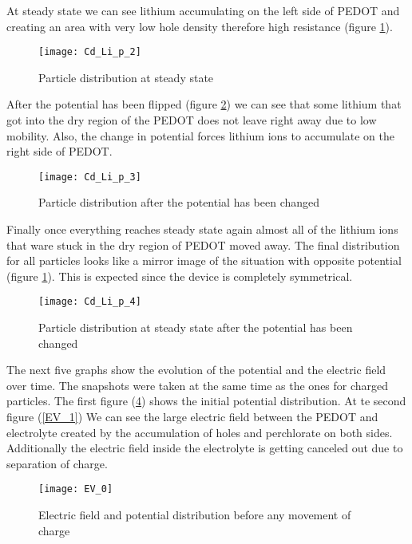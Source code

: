 At steady state we can see lithium accumulating on the left side of PEDOT and creating an area with very low hole density therefore high resistance (figure \ref{Cd_Li_p_2}). 

\begin{figure}[!htp]
\centering
\texttt{[image: Cd\_Li\_p\_2]}
\caption{Particle distribution at steady state} 
\label{Cd_Li_p_2}
\end{figure}

After the potential has been flipped (figure \ref{Cd_Li_p_3}) we can see that some lithium that got into the dry region of the PEDOT does not leave right away due to low mobility. Also, the change in potential forces lithium ions to accumulate on the right side of PEDOT.
 
\begin{figure}[!htp]
\centering
\texttt{[image: Cd\_Li\_p\_3]}
\caption{Particle distribution after the potential has been changed} 
\label{Cd_Li_p_3}
\end{figure}

Finally once everything reaches steady state again almost all of the lithium ions that ware stuck in the dry region of PEDOT moved away. The final distribution for all particles looks like a mirror image of the situation with opposite potential (figure \ref{Cd_Li_p_2}). This is expected since the device is completely symmetrical.

\begin{figure}[!htp]
\centering
\texttt{[image: Cd\_Li\_p\_4]}
\caption{Particle distribution at steady state after the potential has been changed} 
\label{Cd_Li_p_4}
\end{figure}

The next five graphs show the evolution of the potential and the electric field over time. The snapshots were taken at the same time as the ones for charged particles. The first figure (\ref{EV_0}) shows the initial potential distribution. At te second figure (\ref{EV_1}) We can see the large electric field between the PEDOT and electrolyte created by the accumulation of holes and perchlorate on both sides. Additionally the electric field inside the electrolyte is getting canceled out due to separation of charge.

\begin{figure}[!htp]
\centering
\texttt{[image: EV\_0]}
\caption{Electric field and potential distribution before any movement of charge} 
\label{EV_0}
\end{figure}

